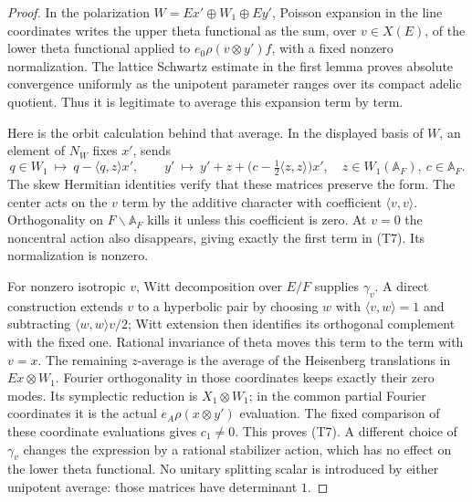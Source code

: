 \begin{proof}
In the polarization \(W=Ex'\oplus W_1\oplus Ey'\), Poisson expansion
in the line coordinates writes the upper theta functional as the sum,
over \(v\in X(E)\), of the lower theta functional applied to
\(e_0\rho(v\otimes y')f\), with a fixed nonzero normalization.
The lattice Schwartz estimate in the first lemma proves absolute
convergence uniformly as the unipotent parameter ranges over its
compact adelic quotient. Thus it is legitimate to average this
expansion term by term.

Here is the orbit calculation behind that average. In the displayed
basis of \(W\), an element of \(N_W\) fixes \(x'\), sends
\[
 q\in W_1\ \longmapsto\ q-\langle q,z\rangle x',\qquad
 y'\ \longmapsto\ y'+z+
            \bigl(c-\tfrac12\langle z,z\rangle\bigr)x',
 \quad z\in W_1(\mathbb A_F),\ c\in\mathbb A_F .
\]
The skew Hermitian identities verify that these matrices preserve
the form. The center acts on the \(v\) term by the additive character
with coefficient \(\langle v,v\rangle\). Orthogonality on
\(F\backslash\mathbb A_F\) kills it unless this coefficient is zero.
At \(v=0\) the noncentral action also disappears, giving exactly the
first term in (T7). Its normalization is nonzero.

For nonzero isotropic \(v\), Witt decomposition over \(E/F\) supplies
\(\gamma_v\). A direct construction extends \(v\) to a hyperbolic
pair by choosing \(w\) with \(\langle v,w\rangle=1\) and subtracting
\(\langle w,w\rangle v/2\); Witt extension then identifies its
orthogonal complement with the fixed one. Rational invariance of
theta moves this term to the term with \(v=x\).
The remaining \(z\)-average is the average of the Heisenberg
translations in \(Ex\otimes W_1\). Fourier orthogonality in those
coordinates keeps exactly their zero modes. Its symplectic reduction
is \(X_1\otimes W_1\); in the common partial Fourier coordinates it is
the actual \(e_A\rho(x\otimes y')\) evaluation.
The fixed comparison of these coordinate evaluations gives \(c_1\ne0\).
This proves (T7). A different choice of \(\gamma_v\) changes the
expression by a rational stabilizer action, which has no effect on
the lower theta functional. No unitary splitting scalar is introduced
by either unipotent average: those matrices have determinant \(1\).
\end{proof}

